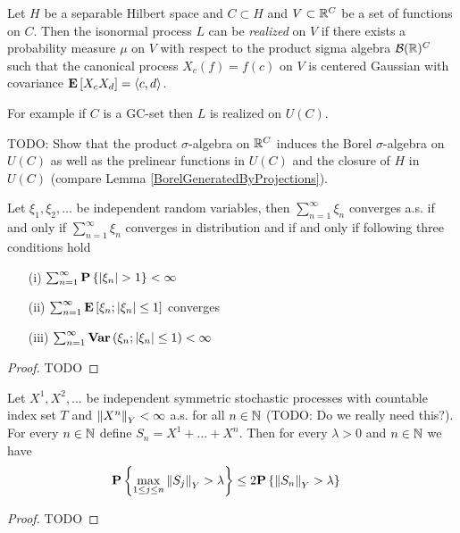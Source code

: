 \begin{defn}Let $H$ be a separable Hilbert space and $C \subset H$ and $V \subset \mathbb{R}^C$ be a set of functions on $C$.  Then the isonormal process $L$ can be \emph{realized} on $V$ if there exists a probability measure $\mu$ on $V$ with respect to the product sigma algebra $\mathcal{B}(\mathbb{R})^C$ such that the canonical process $X_c(f) = f(c)$ on $V$ is centered Gaussian with covariance $\textbf{E}\left[X_c X_d\right] = \langle c , d \rangle$.
\end{defn}
For example if $C$ is a GC-set then $L$ is realized on $U(C)$.

TODO: Show that the product $\sigma$-algebra on $\mathbb{R}^C$ induces the Borel $\sigma$-algebra on $U(C)$ as well as the prelinear functions in $U(C)$ and the closure of $H$ in $U(C)$ (compare Lemma \ref{BorelGeneratedByProjections}).

\begin{thm}\label{LevyThreeSeriesCondition}Let $\xi_1, \xi_2, \dotsc$ be independent random variables, then $\sum_{n=1}^\infty \xi_n$ converges a.s. if and only if $\sum_{n=1}^\infty \xi_n$ converges in distribution and if and only if following three conditions hold
\begin{itemize}
\item[(i)] $\sum_{n=1}^\infty \textbf{P}\left \{ \left \vert \xi_n \right \vert > 1 \right \} < \infty$
\item[(ii)] $\sum_{n=1}^\infty \textbf{E}\left[ \xi_n ; \left \vert \xi_n \right \vert \leq 1\right]$ converges
\item[(iii)] $\sum_{n=1}^\infty \textbf{Var} \left ( \xi_n ; \left \vert \xi_n \right \vert \leq 1 \right ) < \infty$
\end{itemize}
\end{thm}
\begin{proof}
TODO
\end{proof}

\begin{thm}\label{LevySymmetricMaximalInequality}Let $X^1, X^2, \dotsc$ be independent symmetric stochastic processes with countable index set $T$ and $\left \lVert X^n \right \rVert_Y < \infty$ a.s. for all $n \in \mathbb{N}$ (TODO: Do we really need this?).  For every $n \in \mathbb{N}$ define $S_n = X^1 + \dotsc + X^n$. Then for every $\lambda > 0$ and $n \in \mathbb{N}$ we have
\begin{align*}
\textbf{P}\left \{ \max_{1 \leq j \leq n} \left \lVert S_j \right \rVert_Y > \lambda \right \} &\leq 2 \textbf{P}\left \{\left \lVert S_n \right \rVert_Y > \lambda \right \} 
\end{align*}
\end{thm}
\begin{proof}
TODO
\end{proof}

